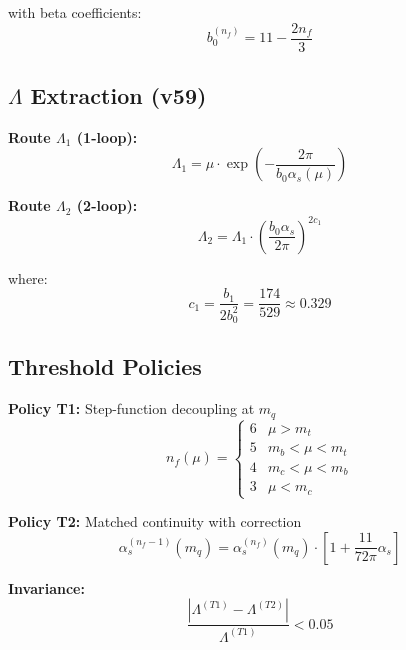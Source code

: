 \documentclass[11pt,a4paper]{article}
\theoremstyle{definition}
\begin{document}
with beta coefficients:
\begin{equation}
\label{eq:b0-nf}
b_0^{(n_f)} = 11 - \frac{2n_f}{3}
\end{equation}

\subsection{$\Lambda$ Extraction (v59)}
\label{subsec:lambda-extraction}

\textbf{Route $\Lambda_1$ (1-loop):}
\begin{equation}
\label{eq:lambda1-canon}
\boxed{\Lambda_1 = \mu \cdot \exp\left(-\frac{2\pi}{b_0 \alpha_s(\mu)}\right)}
\end{equation}

\textbf{Route $\Lambda_2$ (2-loop):}
\begin{equation}
\label{eq:lambda2-canon}
\boxed{\Lambda_2 = \Lambda_1 \cdot \left(\frac{b_0 \alpha_s}{2\pi}\right)^{2c_1}}
\end{equation}

where:
\begin{equation}
\label{eq:c1-canon}
c_1 = \frac{b_1}{2b_0^2} = \frac{174}{529} \approx 0.329
\end{equation}

\subsection{Threshold Policies}
\label{subsec:threshold-policies}

\textbf{Policy T1:} Step-function decoupling at $m_q$
\begin{equation}
\label{eq:t1-canon}
n_f(\mu) = \begin{cases} 6 & \mu > m_t \\ 5 & m_b < \mu < m_t \\ 4 & m_c < \mu < m_b \\ 3 & \mu < m_c \end{cases}
\end{equation}

\textbf{Policy T2:} Matched continuity with correction
\begin{equation}
\label{eq:t2-canon}
\alpha_s^{(n_f-1)}(m_q) = \alpha_s^{(n_f)}(m_q) \cdot \left[1 + \frac{11}{72\pi}\alpha_s\right]
\end{equation}

\textbf{Invariance:}
\begin{equation}
\label{eq:threshold-invariance-canon}
\frac{|\Lambda^{(T1)} - \Lambda^{(T2)}|}{\Lambda^{(T1)}} < 0.05
\end{equation}
\end{document}
